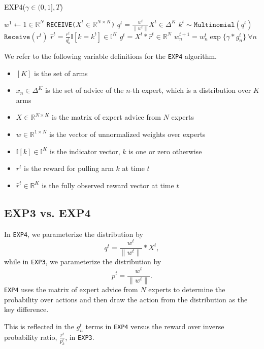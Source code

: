 \documentclass[11pt]{article}
\begin{document}
\begin{algorithm}[H]
\caption{EXP4($\gamma \in (0,1], T$)}
\begin{algorithmic}
\STATE $w^1 \gets 1 \in \mathbb{R}^N$
    \STATE \texttt{RECEIVE($X^t \in \mathbb{R}^{N \times K}$)}
    \STATE $q^t = \frac{w^t}{\|w^t\|}X^t \in \Delta^K$
    \STATE $k^t \sim \texttt{Multinomial}(q^t)$
    \STATE $\texttt{Receive}(r^t)$
    \STATE $\hat{r}^t = \frac{r^t}{q_k^t}\mathbb{I}[k=k^t]\in \mathbb{I}^K$
    \STATE $g^t = X^t * \hat{r}^t \in \mathbb{R}^N$
    \STATE $w_n^{t+1} = w_n^t \exp\{\gamma *g_n^t\} \ \forall n$
\ENDFOR
\end{algorithmic}
\end{algorithm}

We refer to the following variable definitions for the \texttt{EXP4} algorithm.
\begin{itemize}
    \item $[K]$ is the set of arms
    \item $x_n \in \Delta^K$ is the set of advice of the $n$-th expert, which is a distribution over $K$ arms
    \item $X \in \mathbb{R}^{N \times K}$ is the matrix of expert advice from $N$ experts
    \item $w \in \mathbb{R}^{1 \times N}$ is the vector of unnormalized weights over experts
    \item $\mathbb{I}[k] \in \mathbb{I}^K$ is the indicator vector, $k$ is one or zero otherwise
    \item $r^t$ is the reward for pulling arm $k$ at time $t$
    \item $\hat{r}^t \in \mathbb{R}^K$ is the fully observed reward vector at time $t$
    
\end{itemize}

\subsection{EXP3 vs. EXP4}

In \texttt{EXP4}, we parameterize the distribution by 
$$ q^t = \frac{w^t}{\|w^t\|} * X^t, $$
while in \texttt{EXP3}, we parameterize the distribution by 
$$p^t = \frac{w^t}{\|w^t\|}.$$
\texttt{EXP4} uses the matrix of expert advice from $N$ experts to determine the probability over actions and then draw the action from the distribution as the key difference.

This is reflected in the $g_n^t$ terms in \texttt{EXP4} versus the reward over inverse probability ratio, $\frac{r^t}{p_k^t}$, in \texttt{EXP3}.
\end{document}
